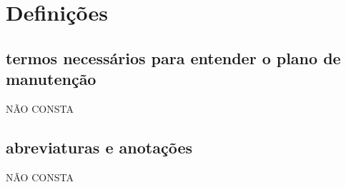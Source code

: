 \chapter{Definições}

\section{termos necessários para entender o plano de manutenção}
NÃO CONSTA
\section{abreviaturas e anotações}
NÃO CONSTA
